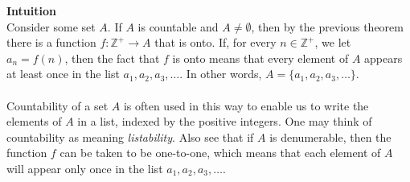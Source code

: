 \documentclass{report}
\theoremstyle{definition}
\begin{document}
\noindent\textbf{Intuition}\\
Consider some set $A$. If $A$ is countable and $A\neq\emptyset$, then by the previous theorem there is a function $f:\mathbb Z^+\to A$ that is onto. If, for every $n\in\mathbb Z^+$, we let 
$a_n=f(n)$, then the fact that $f$ is onto means that every element of $A$ appears at least once in the list $a_1,a_2,a_3,\ldots$. In other words, $A=\{a_1,a_2,a_3,\ldots\}$.\\
\vspace{1mm}\\
Countability of a set $A$ is often used in this way to enable us to write the elements of $A$ in a list, indexed by the positive integers.
One may think of countability as meaning \textit{listability}. Also see that if $A$ is denumerable, then the function $f$ can be taken to be one-to-one, which means that each element of $A$
will appear only once in the list $a_1,a_2,a_3,\ldots$.
\newpage
\end{document}
